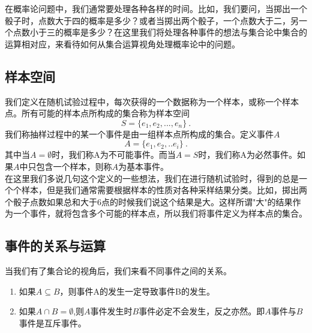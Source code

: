 
\begin{issues}
\issueTODO
\end{issues}

在概率论问题中，我们通常要处理各种各样的时间。比如，我们要问，当掷出一个骰子时，点数大于四的概率是多少？或者当掷出两个骰子，一个点数大于二，另一个点数小于三的概率是多少？在这里我们将处理各种事件的想法与集合论中集合的运算相对应，来看待如何从集合运算视角处理概率论中的问题。
\subsection{样本空间}
我们定义在随机试验过程中，每次获得的一个数据称为一个样本，或称一个样本点。所有可能的样本点所构成的集合称为样本空间
\begin{equation}
S = \{e_1,e_2,...,e_n\}~.
\end{equation}
我们称抽样过程中的某一个事件是由一组样本点所构成的集合。定义事件$A$
\begin{equation}
A = \{e_1,e_2,..e_i\}~.
\end{equation}
其中当$A= \emptyset $时，我们称A为不可能事件。而当$A=S$时，我们称A为必然事件。如果$A$中只包含一个样本，则称$A$为基本事件。\\
在这里我们多说几句这个定义的一些想法，我们在进行随机试验时，得到的总是一个个样本，但是我们通常需要根据样本的性质对各种采样结果分类。比如，掷出两个骰子点数如果总和大于6点的时候我们说这个结果是大。这样所谓"大"的结果作为一个事件，就将包含多个可能的样本点，所以我们将事件定义为样本点的集合。
\subsection{事件的关系与运算}
当我们有了集合论的视角后，我们来看不同事件之间的关系。
\begin{enumerate}
\item 如果$A\subseteq B$，则事件A的发生一定导致事件B的发生。
\item 如果$A \cap B = \emptyset$,则$A$事件发生时$B$事件必定不会发生，反之亦然。即$A$事件与$B$事件是互斥事件。
\end{enumerate}


